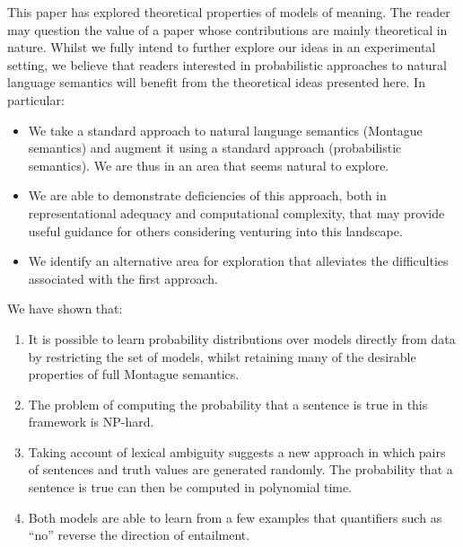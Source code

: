 \documentclass[manuscript]{clv2}
\begin{document}
This paper has explored theoretical properties of models of meaning. The
reader may question the value of a paper whose contributions
are mainly theoretical in nature. Whilst we fully intend to further explore
our ideas in an experimental setting, we believe that readers
interested in probabilistic approaches to natural language semantics
will benefit from the theoretical ideas presented here. In particular:

\begin{itemize}
\item We take a standard approach to natural language semantics
  (Montague semantics) and augment it using a standard approach
  (probabilistic semantics). We are thus in an area that seems natural
  to explore.
\item We are able to demonstrate deficiencies of this approach, both
  in representational adequacy and computational complexity, that may provide
  useful guidance for others considering venturing into this
  landscape.
\item We identify an alternative area for exploration that alleviates
  the difficulties associated with the first approach.
\end{itemize}

We have shown that:

\begin{enumerate}
\item It is possible to learn probability
  distributions over models directly from data by restricting the set of models,
  whilst retaining many of the desirable properties of full Montague
  semantics.
\item The problem of computing the probability that a
  sentence is true in this framework is NP-hard.
\item Taking account of lexical ambiguity suggests a new
  approach in which pairs of sentences and truth values are generated
  randomly. The probability that a sentence is true can then be
  computed in polynomial time.
\item Both models are able to learn from a few examples
  that quantifiers such as ``no'' reverse the direction of entailment.
\end{enumerate}

%
\end{document}
